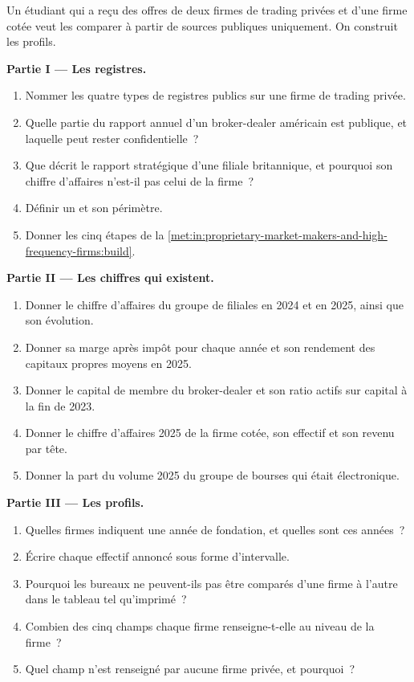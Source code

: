\begin{problem}\label{pb:in:proprietary-market-makers-and-high-frequency-firms:1}
Un étudiant qui a reçu des offres de deux firmes de trading privées et d'une firme cotée veut les comparer à partir de sources publiques
uniquement. On construit les profils.

\medskip\noindent\textbf{Partie I --- Les registres.}
\begin{enumerate}
\item Nommer les quatre types de registres publics sur une firme de trading privée.
\item Quelle partie du rapport annuel d'un broker-dealer américain est publique, et laquelle peut rester confidentielle~?
\item Que décrit le rapport stratégique d'une filiale britannique, et pourquoi son chiffre d'affaires n'est-il pas celui de la firme~?
\item Définir un  et son périmètre.
\item Donner les cinq étapes de la \cref{met:in:proprietary-market-makers-and-high-frequency-firms:build}.
\end{enumerate}

\medskip\noindent\textbf{Partie II --- Les chiffres qui existent.}
\begin{enumerate}[resume]
\item Donner le chiffre d'affaires du groupe de filiales en 2024 et en 2025, ainsi que son évolution.
\item Donner sa marge après impôt pour chaque année et son rendement des capitaux propres moyens en 2025.
\item Donner le capital de membre du broker-dealer et son ratio actifs sur capital à la fin de 2023.
\item Donner le chiffre d'affaires 2025 de la firme cotée, son effectif et son revenu par tête.
\item Donner la part du volume 2025 du groupe de bourses qui était électronique.
\end{enumerate}

\medskip\noindent\textbf{Partie III --- Les profils.}
\begin{enumerate}[resume]
\item Quelles firmes indiquent une année de fondation, et quelles sont ces années~?
\item Écrire chaque effectif annoncé sous forme d'intervalle.
\item Pourquoi les bureaux ne peuvent-ils pas être comparés d'une firme à l'autre dans le tableau tel qu'imprimé~?
\item Combien des cinq champs chaque firme renseigne-t-elle au niveau de la firme~?
\item Quel champ n'est renseigné par aucune firme privée, et pourquoi~?
\end{enumerate}


\end{problem}
